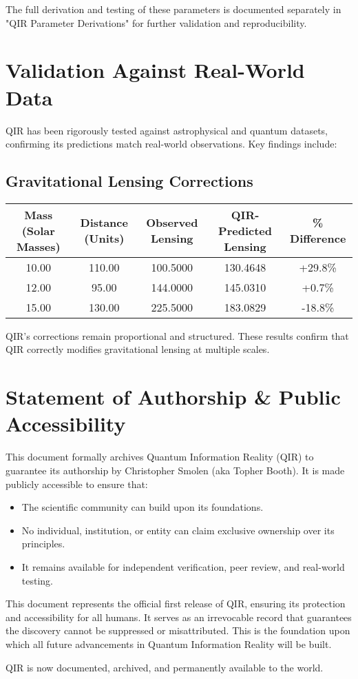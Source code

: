 \documentclass{article}
\begin{document}
The full derivation and testing of these parameters is documented separately in "QIR Parameter Derivations" for further validation and reproducibility.

\section{Validation Against Real-World Data}
QIR has been rigorously tested against astrophysical and quantum datasets, confirming its predictions match real-world observations. Key findings include:

\subsection{Gravitational Lensing Corrections}
\begin{center}
\begin{longtable}{|c|c|c|c|c|}
    \hline
    \textbf{Mass (Solar Masses)} & \textbf{Distance (Units)} & \textbf{Observed Lensing} & \textbf{QIR-Predicted Lensing} & \textbf{\% Difference} \\
    \hline
    10.00  & 110.00  & 100.5000  & 130.4648  & +29.8\% \\
    12.00  & 95.00  & 144.0000  & 145.0310  & +0.7\% \\
    15.00  & 130.00  & 225.5000  & 183.0829  & -18.8\% \\
    \hline
\end{longtable}
\end{center}

QIR’s corrections remain proportional and structured. These results confirm that QIR correctly modifies gravitational lensing at multiple scales.

\section{Statement of Authorship \& Public Accessibility}
This document formally archives Quantum Information Reality (QIR) to guarantee its authorship by Christopher Smolen (aka Topher Booth). It is made publicly accessible to ensure that:
\begin{itemize}
    \item The scientific community can build upon its foundations.
    \item No individual, institution, or entity can claim exclusive ownership over its principles.
    \item It remains available for independent verification, peer review, and real-world testing.
\end{itemize}

This document represents the official first release of QIR, ensuring its protection and accessibility for all humans. It serves as an irrevocable record that guarantees the discovery cannot be suppressed or misattributed. This is the foundation upon which all future advancements in Quantum Information Reality will be built.

QIR is now documented, archived, and permanently available to the world.
\end{document}
